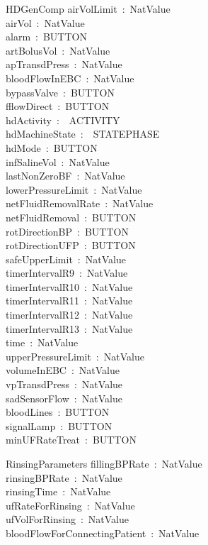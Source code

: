\begin{schema}{HDGenComp}
    airVolLimit~:~NatValue\\
    airVol~:~NatValue\\
    alarm~:~BUTTON\\
    artBolusVol~:~NatValue\\
    apTransdPress~:~NatValue\\
    bloodFlowInEBC~:~NatValue\\
    bypassValve~:~BUTTON\\
    fflowDirect~:~BUTTON\\
    hdActivity~:~\power~ACTIVITY\\
    hdMachineState~:~\power~STATEPHASE\\
    hdMode~:~BUTTON\\
    infSalineVol~:~NatValue\\
    lastNonZeroBF~:~NatValue\\
    lowerPressureLimit~:~NatValue\\
    netFluidRemovalRate~:~NatValue\\
    netFluidRemoval~:~BUTTON\\
    rotDirectionBP~:~BUTTON\\
    rotDirectionUFP~:~BUTTON~\\
    safeUpperLimit~:~NatValue\\
    timerIntervalR9~:~NatValue\\
    timerIntervalR10~:~NatValue\\
    timerIntervalR11~:~NatValue\\
    timerIntervalR12~:~NatValue\\
    timerIntervalR13~:~NatValue\\
    time~:~NatValue\\
    upperPressureLimit~:~NatValue\\
    volumeInEBC~:~NatValue\\
    vpTransdPress~:~NatValue\\
    sadSensorFlow~:~NatValue\\
    bloodLines~:~BUTTON\\
    signalLamp~:~BUTTON\\
    minUFRateTreat~:~BUTTON
\end{schema}
\begin{schema}{RinsingParameters}
    fillingBPRate~:~NatValue\\
    rinsingBPRate~:~NatValue\\
    rinsingTime~:~NatValue\\
    ufRateForRinsing~:~NatValue\\
    ufVolForRinsing~:~NatValue\\
    bloodFlowForConnectingPatient~:~NatValue
\end{schema}

